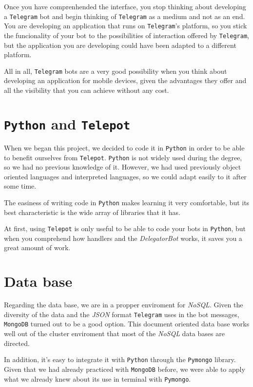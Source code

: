 \documentclass[oneside]{memoir}
\begin{document}
Once you have comprenhended the interface, you stop thinking about developing a \texttt{Telegram} bot and begin thinking of \texttt{Telegram} as a medium and not as an end. You are developing an application that runs on \texttt{Telegram}'s platform, so you stick the funcionality of your bot to the possibilities of interaction offered by \texttt{Telegram}, but the application you are developing could have been adapted to a different platform.

All in all, \texttt{Telegram} bots are a very good possibility when you think about developing an application for mobile devices, given the advantages they offer and all the visibility that you can achieve without any cost.

\section{\texttt{Python} and \texttt{Telepot}}
When we began this project, we decided to code it in \texttt{Python} in order to be able to benefit ourselves from \texttt{Telepot}. \texttt{Python} is not widely used during the degree, so we had no previous knowledge of it. However, we had used previously object oriented languages and interpreted languages, so we could adapt easily to it after some time.

The easiness of writing code in \texttt{Python} makes learning it very comfortable, but its best characteristic is the wide array of libraries that it has.

At first, using \texttt{Telepot} is only useful to be able to code your bots in \texttt{Python}, but when you comprehend how handlers and the \textit{DelegatorBot} works, it saves you a great amount of work.

\section{Data base}
Regarding the data base, we are in a propper enviroment for \textit{NoSQL}. Given the diversity of the data and the \textit{JSON} format \texttt{Telegram} uses in the bot messages, \texttt{MongoDB} turned out to be a good option. This document oriented data base works well out of the cluster enviroment that most of the \textit{NoSQL} data bases are directed.

In addition, it's easy to integrate it with \texttt{Python} through the \texttt{Pymongo} library. Given that we had already practiced with \texttt{MongoDB} before, we were able to apply what we already knew about its use in terminal with \texttt{Pymongo}.
\end{document}
